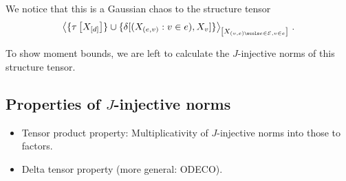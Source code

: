 We notice that this is a Gaussian chaos to the structure tensor
\begin{align*}
    \contractionof{\{\hypercorewith\}\cup\{\delta[(\catvariableof{(\edge,\node)}:\node\in\edge),\catvariableof{\node}]\}}{
        \catvariableof{(\node,\edge)\wcols \edgein,\node\in\edge}
    } \, .
\end{align*}

To show moment bounds, we are left to calculate the $J$-injective norms of this structure tensor.

\subsection{Properties of $J$-injective norms}

\begin{itemize}
    \item Tensor product property: Multiplicativity of $J$-injective norms into those to factors.
    \item Delta tensor property (more general: ODECO).
\end{itemize}